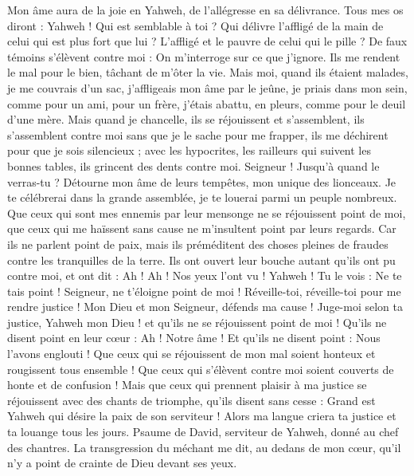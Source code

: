 \begin{multicols}{2}
Mon âme aura de la joie en Yahweh, de l’allégresse en sa délivrance.
Tous mes os diront : Yahweh ! Qui est semblable à toi ? Qui délivre l'affligé de la main de celui qui est plus fort que lui ? L'affligé et le pauvre de celui qui le pille ?
De faux témoins s'élèvent contre moi : On m’interroge sur ce que j’ignore.
Ils me rendent le mal pour le bien, tâchant de m'ôter la vie.
Mais moi, quand ils étaient malades, je me couvrais d'un sac, j'affligeais mon âme par le jeûne, je priais dans mon sein,
comme pour un ami, pour un frère, j’étais abattu, en pleurs, comme pour le deuil d’une mère.
Mais quand je chancelle, ils se réjouissent et s'assemblent, ils s’assemblent contre moi sans que je le sache pour me frapper, ils me déchirent pour que je sois silencieux ;
avec les hypocrites, les railleurs qui suivent les bonnes tables, ils grincent des dents contre moi.
Seigneur ! Jusqu'à quand le verras-tu ? Détourne mon âme de leurs tempêtes, mon unique des lionceaux.
Je te célébrerai dans la grande assemblée, je te louerai parmi un peuple nombreux.
Que ceux qui sont mes ennemis par leur mensonge ne se réjouissent point de moi, que ceux qui me haïssent sans cause ne m'insultent point par leurs regards.
Car ils ne parlent point de paix, mais ils préméditent des choses pleines de fraudes contre les tranquilles de la terre.
Ils ont ouvert leur bouche autant qu'ils ont pu contre moi, et ont dit : Ah ! Ah ! Nos yeux l’ont vu !
Yahweh ! Tu le vois : Ne te tais point ! Seigneur, ne t'éloigne point de moi !
Réveille-toi, réveille-toi pour me rendre justice ! Mon Dieu et mon Seigneur, défends ma cause !
Juge-moi selon ta justice, Yahweh mon Dieu ! et qu'ils ne se réjouissent point de moi !
Qu'ils ne disent point en leur cœur : Ah ! Notre âme ! Et qu'ils ne disent point : Nous l'avons englouti !
Que ceux qui se réjouissent de mon mal soient honteux et rougissent tous ensemble ! Que ceux qui s'élèvent contre moi soient couverts de honte et de confusion !
Mais que ceux qui prennent plaisir à ma justice se réjouissent avec des chants de triomphe, qu'ils disent sans cesse : Grand est Yahweh qui désire la paix de son serviteur !
Alors ma langue criera ta justice et ta louange tous les jours.
\VerseOne{}Psaume de David, serviteur de Yahweh, donné au chef des chantres.
La transgression du méchant me dit, au dedans de mon cœur, qu'il n'y a point de crainte de Dieu devant ses yeux.

\end{multicols}
